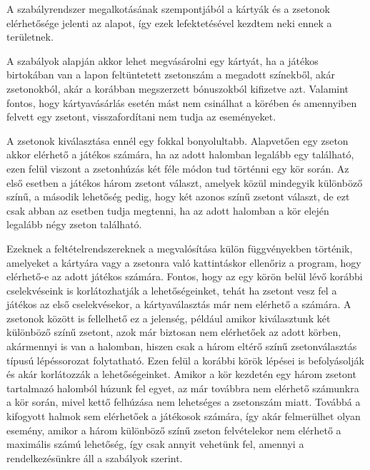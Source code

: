 A szabályrendszer megalkotásának szempontjából a kártyák és a zsetonok elérhetősége jelenti az alapot, így ezek  lefektetésével kezdtem neki ennek a területnek.\par
A szabályok alapján akkor lehet megvásárolni egy kártyát, ha a játékos birtokában van a lapon feltüntetett zsetonszám a megadott színekből, akár zsetonokból, akár a korábban megszerzett bónuszokból kifizetve azt. Valamint fontos, hogy kártyavásárlás esetén mást nem csinálhat a körében és amennyiben felvett egy zsetont, visszafordítani nem tudja az eseményeket.\par
A zsetonok kiválasztása ennél egy fokkal bonyolultabb. Alapvetően egy zseton akkor elérhető a játékos számára, ha az adott halomban legalább egy található, ezen felül viszont a zsetonhúzás két féle módon tud történni egy kör során. Az első esetben a játékos három zsetont választ, amelyek közül mindegyik különböző színű, a második lehetőség pedig, hogy két azonos színű zsetont választ, de ezt csak abban az esetben tudja megtenni, ha az adott halomban a kör elején legalább négy zseton található.\par
Ezeknek a feltételrendszereknek a megvalósítása külön függvényekben történik, amelyeket a kártyára vagy a zsetonra való kattintáskor ellenőriz a program, hogy elérhető-e az adott játékos számára. Fontos, hogy az egy körön belül lévő korábbi cselekvéseink is korlátozhatják a lehetőségeinket, tehát ha zsetont vesz fel a játékos az első cselekvésekor, a kártyaválasztás már nem elérhető a számára. A zsetonok között is fellelhető ez a jelenség, például amikor kiválasztunk két különböző színű zsetont, azok már biztosan nem elérhetőek az adott körben, akármennyi is van a halomban, hiszen csak a három eltérő színű zsetonválasztás típusú lépéssorozat folytatható. Ezen felül a korábbi körök lépései is befolyásolják és akár korlátozzák a lehetőségeinket. Amikor a kör kezdetén egy három zsetont tartalmazó halomból húzunk fel egyet, az már továbbra nem elérhető számunkra a kör során, mivel kettő felhúzása nem lehetséges a zsetonszám miatt. Továbbá a kifogyott halmok sem elérhetőek a játékosok számára, így akár felmerülhet olyan esemény, amikor a három különböző színű zseton felvételekor nem elérhető a maximális számú lehetőség, így csak annyit vehetünk fel, amennyi a rendelkezésünkre áll a szabályok szerint.

